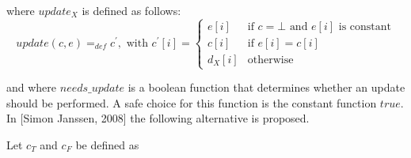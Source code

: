 \documentclass{article}
\begin{document}
where $update_{X}$ is defined as follows:%
\begin{equation*}
update(c,e)=_{def}c^{\prime },\text{ with }c^{\prime }[i]=\left\{
\begin{array}{ll}
e[i] & \text{if }c=\bot \text{ and }e[i]\text{ is constant} \\
c[i] & \text{if }e[i]=c[i] \\
d_{X}[i] & \text{otherwise}%
\end{array}%
\right.
\end{equation*}

and where $needs\_update$ is a boolean function that determines whether an
update should be performed. A safe choice for this function is the constant
function $true$. In [Simon Janssen, 2008] the following alternative is
proposed.

Let $c_{T}$ and $c_{F}$ be defined as
\end{document}
